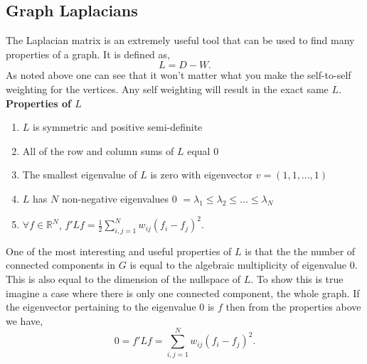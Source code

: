 \documentclass[a4paper]{article}
\begin{document}
\begin{multicols}{2}
\subsection{Graph Laplacians}
The Laplacian matrix is an extremely useful tool that can be used to find many properties of a graph. It is defined as,
$$
L = D - W.
$$
As noted above one can see that it won't matter what you make the self-to-self weighting for the vertices. Any self weighting will result in the exact same $L$.
\newline
\textbf{Properties of $L$}
\begin{enumerate}
\item $L$ is symmetric and positive semi-definite
\item All of the row and column sums of $L$ equal 0
\item The smallest eigenvalue of $L$ is zero with eigenvector $v = (1, 1, ..., 1)$
\item $L$ has $N$ non-negative eigenvalues 0 $=\lambda_1 \leq \lambda_2 \leq ... \leq \lambda_N$
\item $\forall  f \in \mathbb{R}^N$,   
$
f'Lf = \frac{1}{2} \sum_{i,j = 1}^N w_{ij}(f_i - f_j)^2. 
$
\end{enumerate}
One of the most interesting and useful properties of $L$ is that the the number of connected components in $G$ is equal to the algebraic multiplicity of eigenvalue 0. This is also equal to the dimension of the nullspace of $L$. To show this is true imagine a case where there is only one connected component, the whole graph. If the eigenvector pertaining to the eigenvalue 0 is $f$ then from the properties above we have,
\begin{equation}\label{eq}
0 = f' L f = \sum_{i,j=1}^N w_{ij}(f_i - f_j)^2.
\end{equation}

\end{multicols}
\end{document}
